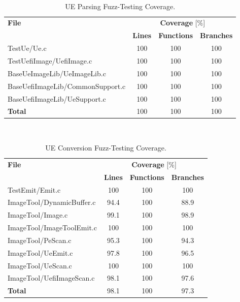 \begin{table}[!htb]
  \centering
  \caption{UE Parsing Fuzz-Testing Coverage.}
  \hfill\\
  \begin{tabular}{l c c c}
    \toprule
    \multirow{2}{*}[-2pt]{\textbf{File}} & \multicolumn{3}{c}{\textbf{Coverage} [\%]}\\
    \cmidrule{2-4}
    & \textbf{Lines} & \textbf{Functions} & \textbf{Branches}\\
    \midrule
    TestUe/Ue.c & 100 & 100 & 100\\
    TestUefiImage/UefiImage.c & 100 & 100 & 100\\
    BaseUeImageLib/UeImageLib.c & 100 & 100 & 100\\
    BaseUefiImageLib/CommonSupport.c & 100 & 100 & 100\\
    BaseUefiImageLib/UeSupport.c & 100 & 100 & 100\\
    \midrule
    \textbf{Total} & 100 & 100 & 100\\
    \bottomrule
  \end{tabular}
\end{table}

\begin{table}[!htb]
  \centering
  \caption{UE Conversion Fuzz-Testing Coverage.}
  \hfill\\
  \begin{tabular}{l c c c}
    \toprule
    \multirow{2}{*}[-2pt]{\textbf{File}} & \multicolumn{3}{c}{\textbf{Coverage} [\%]}\\
    \cmidrule{2-4}
    & \textbf{Lines} & \textbf{Functions} & \textbf{Branches}\\
    \midrule
    TestEmit/Emit.c & 100 & 100 & 100\\
    ImageTool/DynamicBuffer.c & 94.4 & 100 & 88.9\\
    ImageTool/Image.c & 99.1 & 100 & 98.9\\
    ImageTool/ImageToolEmit.c & 100 & 100 & 100\\
    ImageTool/PeScan.c & 95.3 & 100 & 94.3\\
    ImageTool/UeEmit.c & 97.8 & 100 & 96.5\\
    ImageTool/UeScan.c & 100 & 100 & 100\\
    ImageTool/UefiImageScan.c & 98.1 & 100 & 97.6\\
    \midrule
    \textbf{Total} & 98.1 & 100 & 97.3\\
    \bottomrule
  \end{tabular}
\end{table}

